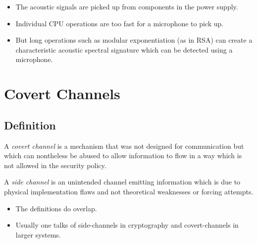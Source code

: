 \documentclass{beamer}
\begin{document}
\begin{frame}{\insertsubsectionhead}
  \begin{itemize}
    \item The acoustic signals are picked up from components in the power 
      supply.

    \item Individual CPU operations are too fast for a microphone to pick up.

    \item But long operations such as modular exponentiation (as in RSA) can 
      create a characteristic acoustic spectral signature which can be detected 
      using a microphone.
  \end{itemize}
\end{frame}


\section{Covert Channels}

\subsection{Definition}

\begin{frame}{\insertsubsectionhead}
  \begin{definition}
    A \emph{covert channel} is a mechanism that was not designed for 
    communication but which can nontheless be abused to allow information to 
    flow in a way which is not allowed in the security policy.
  \end{definition}
  \begin{definition}
    A \emph{side channel} is an unintended channel emitting information which 
    is due to physical implementation flaws and not theoretical weaknesses or 
    forcing attempts.
  \end{definition}
\end{frame}

\begin{frame}{\insertsubsectionhead}
  \begin{itemize}
    \item The definitions do overlap.

    \item Usually one talks of side-channels in cryptography and 
      covert-channels in larger systems.
  \end{itemize}
\end{frame}
\end{document}
